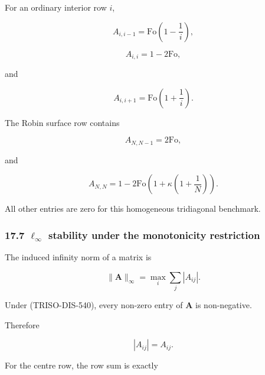 \documentclass[11pt,a4paper]{article}
\begin{document}
For an ordinary interior row $i$,

\begin{equation}
A_{i,i-1}
=
\mathrm{Fo}
\left(
1-\frac1i
\right),
\tag{TRISO-DIS-546}
\label{eq:triso-dis-546}
\end{equation}

\begin{equation}
A_{i,i}
=
1-2\mathrm{Fo},
\tag{TRISO-DIS-547}
\label{eq:triso-dis-547}
\end{equation}

and

\begin{equation}
A_{i,i+1}
=
\mathrm{Fo}
\left(
1+\frac1i
\right).
\tag{TRISO-DIS-548}
\label{eq:triso-dis-548}
\end{equation}

The Robin surface row contains

\begin{equation}
A_{N,N-1}=2\mathrm{Fo},
\tag{TRISO-DIS-549}
\label{eq:triso-dis-549}
\end{equation}

and

\begin{equation}
A_{N,N}
=
1
-
2\mathrm{Fo}
\left(
1+\kappa\left(1+\frac1N\right)
\right).
\tag{TRISO-DIS-550}
\label{eq:triso-dis-550}
\end{equation}

All other entries are zero for this homogeneous tridiagonal benchmark.

\subsubsection*{17.7 $\ell_\infty$ stability under the monotonicity restriction}

The induced infinity norm of a matrix is

\begin{equation}
\|\mathbf A\|_\infty
=
\max_i
\sum_j
|A_{ij}|.
\tag{TRISO-DIS-551}
\label{eq:triso-dis-551}
\end{equation}

Under (TRISO-DIS-540), every non-zero entry of $\mathbf A$ is non-negative.

Therefore

\begin{equation}
|A_{ij}|=A_{ij}.
\tag{TRISO-DIS-552}
\label{eq:triso-dis-552}
\end{equation}

For the centre row, the row sum is exactly
\end{document}
